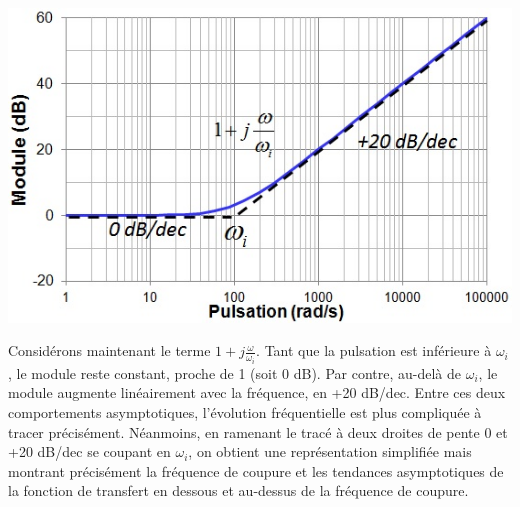 	\vspace{1\baselineskip}
	
	\begin{minipage}[l]{0.5\linewidth}
		\includegraphics[scale=0.6]{images/Trace_asympt__1_plus_jw.jpg}
	\end{minipage} \hfill
	\begin{minipage}[c]{0.50\linewidth}
		Considérons maintenant le terme $1+j\frac{\omega}{\omega_{i}}$.	Tant que la pulsation est inférieure à $\omega_{i}$, le module reste constant, proche de 1 (soit 0 dB). Par contre, au-delà de $\omega_{i}$, le module augmente linéairement avec la fréquence, en +20 dB/dec. Entre ces deux comportements asymptotiques, l'évolution fréquentielle est plus compliquée à tracer précisément. Néanmoins, en ramenant le tracé à deux droites de pente 0 et +20 dB/dec se coupant en $\omega_{i}$, on obtient une représentation simplifiée mais montrant précisément la fréquence de coupure et les tendances asymptotiques de la fonction de transfert en dessous et au-dessus de la fréquence de coupure.	
	\end{minipage}

